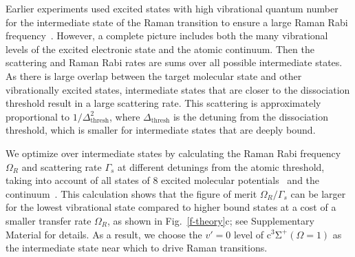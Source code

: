 \documentclass[aps,prl,twocolumn,10pt,superscriptaddress]{revtex4-1}
\begin{document}
Earlier experiments used excited states with high vibrational quantum number for the intermediate state
of the Raman transition to ensure a large Raman Rabi frequency~\cite{Wynar2000,Rom2004}.
However, a complete picture includes both the many vibrational levels
of the excited electronic state and the atomic continuum.
Then the scattering and Raman Rabi rates are sums over all possible intermediate states.
As there is large overlap between the target molecular state and other vibrationally excited states, intermediate states that are closer to the dissociation threshold result in a large scattering rate.
This scattering is approximately proportional to $1/\Delta_{\mathrm{thresh}}^2$,
where $\Delta_{\mathrm{thresh}}$ is the detuning from the dissociation threshold,
which is smaller for intermediate states that are deeply bound.


We optimize over intermediate states by calculating the Raman Rabi frequency $\Omega_R$
and scattering rate $\Gamma_s$ at different detunings from the atomic threshold,
taking into account of all states of
8 excited molecular potentials~\cite{Korek2007, Grochola2011, Zaharova2009, Grochola2010, Zabawa2012}
and the continuum~\cite{Liu2017}.
This calculation shows that the figure of merit $\Omega_R/\Gamma_s$
can be larger for the lowest vibrational state compared to higher bound states
at a cost of a smaller transfer rate $\Omega_R$, as shown in Fig.~\ref{f-theory}c;
see Supplementary Material for details.
As a result, we choose the $v'=0$ level of $\mathrm{c^3\Sigma^+}(\Omega = 1)$
as the intermediate state near which to drive Raman transitions.
\end{document}
